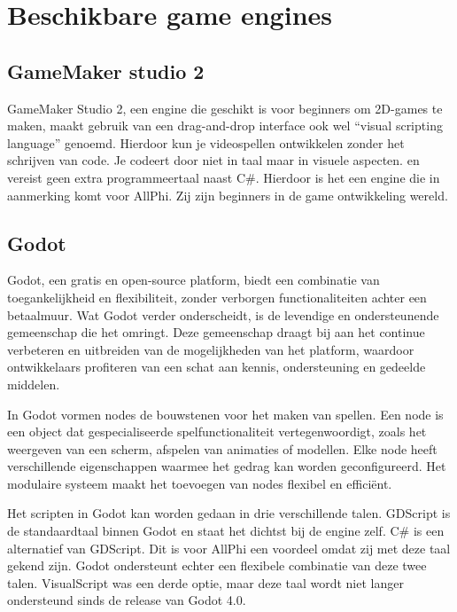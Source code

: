\section{Beschikbare game engines}
\subsection{GameMaker studio 2}
GameMaker Studio 2, een engine die geschikt is voor beginners om 2D-games te maken, maakt gebruik van een drag-and-drop interface ook wel ``visual scripting language''  genoemd. Hierdoor kun je videospellen ontwikkelen zonder het schrijven van code. Je codeert door niet in taal maar in visuele aspecten. en vereist geen extra programmeertaal naast C\#. Hierdoor is het een engine die in aanmerking komt voor AllPhi. Zij zijn beginners in de game ontwikkeling wereld. \autocite{cossu2019game}

\subsection{Godot}
Godot, een gratis en open-source platform, biedt een combinatie van toegankelijkheid en flexibiliteit, zonder verborgen functionaliteiten achter een betaalmuur. Wat Godot verder onderscheidt, is de levendige en ondersteunende gemeenschap die het omringt. Deze gemeenschap draagt bij aan het continue verbeteren en uitbreiden van de mogelijkheden van het platform, waardoor ontwikkelaars profiteren van een schat aan kennis, ondersteuning en gedeelde middelen. \autocite{Bradfield2018}

In Godot vormen nodes de bouwstenen voor het maken van spellen. Een node is een object dat gespecialiseerde spelfunctionaliteit vertegenwoordigt, zoals het weergeven van een scherm, afspelen van animaties of modellen. Elke node heeft verschillende eigenschappen waarmee het gedrag kan worden geconfigureerd. Het modulaire systeem maakt het toevoegen van nodes flexibel en efficiënt. \autocite{Bradfield2018}

Het scripten in Godot kan worden gedaan in drie verschillende talen. GDScript is de standaardtaal binnen Godot en staat het dichtst bij de engine zelf. C# is een alternatief van GDScript. Dit is voor AllPhi een voordeel omdat zij met deze taal gekend zijn. Godot ondersteunt echter een flexibele combinatie van deze twee talen.\autocite{Bradfield2018} VisualScript was een derde optie, maar deze taal wordt niet langer ondersteund sinds de release van Godot 4.0.

